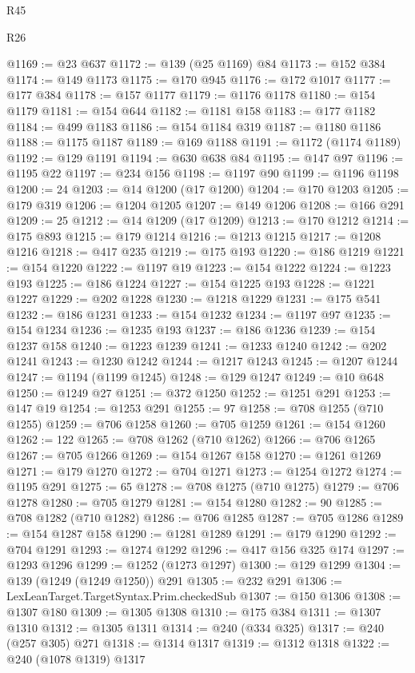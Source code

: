 \begin{lexlean}{R45}
\begin{lexlean}{R26}
\begin{coremodule}
{{{{{{{{{{{{{{{{{{{{{{{{{{{{{{{{{{{{{{{{{{{{{{{{{{{{{{{{{{{{{{{{{{{{{{{{@1169 := @23 @637
@1172 := @139 (@25 @1169) @84
@1173 := @152 @384
@1174 := @149 @1173
@1175 := @170 @945
@1176 := @172 @1017
@1177 := @177 @384
@1178 := @157 @1177
@1179 := @1176 @1178
@1180 := @154 @1179
@1181 := @154 @644
@1182 := @1181 @158
@1183 := @177 @1182
@1184 := @499 @1183
@1186 := @154 @1184 @319
@1187 := @1180 @1186
@1188 := @1175 @1187
@1189 := @169 @1188
@1191 := @1172 (@1174 @1189)
@1192 := @129 @1191
@1194 := @630 @638 @84
@1195 := @147 @97
@1196 := @1195 @22
@1197 := @234 @156
@1198 := @1197 @90
@1199 := @1196 @1198
@1200 := 24
@1203 := @14 @1200 (@17 @1200)
@1204 := @170 @1203
@1205 := @179 @319
@1206 := @1204 @1205
@1207 := @149 @1206
@1208 := @166 @291
@1209 := 25
@1212 := @14 @1209 (@17 @1209)
@1213 := @170 @1212
@1214 := @175 @893
@1215 := @179 @1214
@1216 := @1213 @1215
@1217 := @1208 @1216
@1218 := @417 @235
@1219 := @175 @193
@1220 := @186 @1219
@1221 := @154 @1220
@1222 := @1197 @19
@1223 := @154 @1222
@1224 := @1223 @193
@1225 := @186 @1224
@1227 := @154 @1225 @193
@1228 := @1221 @1227
@1229 := @202 @1228
@1230 := @1218 @1229
@1231 := @175 @541
@1232 := @186 @1231
@1233 := @154 @1232
@1234 := @1197 @97
@1235 := @154 @1234
@1236 := @1235 @193
@1237 := @186 @1236
@1239 := @154 @1237 @158
@1240 := @1223 @1239
@1241 := @1233 @1240
@1242 := @202 @1241
@1243 := @1230 @1242
@1244 := @1217 @1243
@1245 := @1207 @1244
@1247 := @1194 (@1199 @1245)
@1248 := @129 @1247
@1249 := @10 @648
@1250 := @1249 @27
@1251 := @372 @1250
@1252 := @1251 @291
@1253 := @147 @19
@1254 := @1253 @291
@1255 := 97
@1258 := @708 @1255 (@710 @1255)
@1259 := @706 @1258
@1260 := @705 @1259
@1261 := @154 @1260
@1262 := 122
@1265 := @708 @1262 (@710 @1262)
@1266 := @706 @1265
@1267 := @705 @1266
@1269 := @154 @1267 @158
@1270 := @1261 @1269
@1271 := @179 @1270
@1272 := @704 @1271
@1273 := @1254 @1272
@1274 := @1195 @291
@1275 := 65
@1278 := @708 @1275 (@710 @1275)
@1279 := @706 @1278
@1280 := @705 @1279
@1281 := @154 @1280
@1282 := 90
@1285 := @708 @1282 (@710 @1282)
@1286 := @706 @1285
@1287 := @705 @1286
@1289 := @154 @1287 @158
@1290 := @1281 @1289
@1291 := @179 @1290
@1292 := @704 @1291
@1293 := @1274 @1292
@1296 := @417 @156 @325 @174
@1297 := @1293 @1296
@1299 := @1252 (@1273 @1297)
@1300 := @129 @1299
@1304 := @139 (@1249 (@1249 @1250)) @291
@1305 := @232 @291
@1306 := LexLeanTarget.TargetSyntax.Prim.checkedSub
@1307 := @150 @1306
@1308 := @1307 @180
@1309 := @1305 @1308
@1310 := @175 @384
@1311 := @1307 @1310
@1312 := @1305 @1311
@1314 := @240 (@334 @325)
@1317 := @240 (@257 @305) @271
@1318 := @1314 @1317
@1319 := @1312 @1318
@1322 := @240 (@1078 @1319) @1317
}}}}}}}}}}}}}}}}}}}}}}}}}}}}}}}}}}}}}}}}}}}}}}}}}}}}}}}}}}}}}}}}}}}}}}}}
\end{coremodule}
\end{lexlean}
\end{lexlean}
